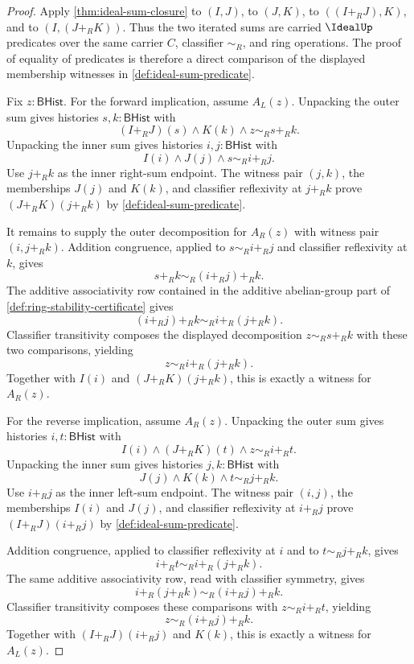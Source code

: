\begin{proof}
Apply \autoref{thm:ideal-sum-closure} to $(I,J)$, to $(J,K)$, to $((I+_RJ),K)$, and to $(I,(J+_RK))$. Thus the two iterated sums are carried $\IdealUp$ predicates over the same carrier $C$, classifier $\sim_R$, and ring operations. The proof of equality of predicates is therefore a direct comparison of the displayed membership witnesses in \autoref{def:ideal-sum-predicate}.

Fix $z:\mathsf{BHist}$. For the forward implication, assume $A_L(z)$. Unpacking the outer sum gives histories $s,k:\mathsf{BHist}$ with
$$
(I+_RJ)(s)\land K(k)\land z\sim_R s+_R k.
$$
Unpacking the inner sum gives histories $i,j:\mathsf{BHist}$ with
$$
I(i)\land J(j)\land s\sim_R i+_R j.
$$
Use $j+_R k$ as the inner right-sum endpoint. The witness pair $(j,k)$, the memberships $J(j)$ and $K(k)$, and classifier reflexivity at $j+_R k$ prove $(J+_RK)(j+_R k)$ by \autoref{def:ideal-sum-predicate}.

It remains to supply the outer decomposition for $A_R(z)$ with witness pair $(i,j+_R k)$. Addition congruence, applied to $s\sim_R i+_R j$ and classifier reflexivity at $k$, gives
$$
s+_R k\sim_R (i+_R j)+_R k.
$$
The additive associativity row contained in the additive abelian-group part of \autoref{def:ring-stability-certificate} gives
$$
(i+_R j)+_R k\sim_R i+_R(j+_R k).
$$
Classifier transitivity composes the displayed decomposition $z\sim_Rs+_Rk$ with these two comparisons, yielding
$$
z\sim_R i+_R(j+_R k).
$$
Together with $I(i)$ and $(J+_RK)(j+_R k)$, this is exactly a witness for $A_R(z)$.

For the reverse implication, assume $A_R(z)$. Unpacking the outer sum gives histories $i,t:\mathsf{BHist}$ with
$$
I(i)\land (J+_RK)(t)\land z\sim_R i+_R t.
$$
Unpacking the inner sum gives histories $j,k:\mathsf{BHist}$ with
$$
J(j)\land K(k)\land t\sim_R j+_R k.
$$
Use $i+_R j$ as the inner left-sum endpoint. The witness pair $(i,j)$, the memberships $I(i)$ and $J(j)$, and classifier reflexivity at $i+_R j$ prove $(I+_RJ)(i+_R j)$ by \autoref{def:ideal-sum-predicate}.

Addition congruence, applied to classifier reflexivity at $i$ and to $t\sim_R j+_R k$, gives
$$
i+_R t\sim_R i+_R(j+_R k).
$$
The same additive associativity row, read with classifier symmetry, gives
$$
i+_R(j+_R k)\sim_R (i+_R j)+_R k.
$$
Classifier transitivity composes these comparisons with $z\sim_Ri+_Rt$, yielding
$$
z\sim_R (i+_R j)+_R k.
$$
Together with $(I+_RJ)(i+_R j)$ and $K(k)$, this is exactly a witness for $A_L(z)$.


\end{proof}
